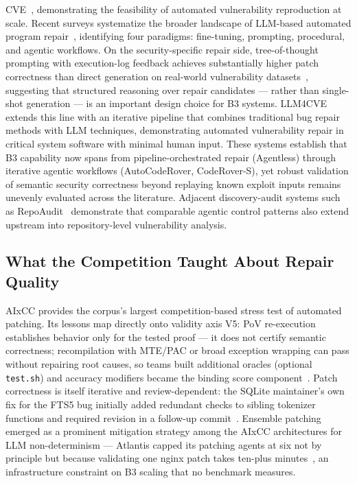 \documentclass[conference,compsoc]{IEEEtran}
\begin{document}
CVE~\cite{cvegenie2025}, demonstrating the feasibility of automated vulnerability reproduction
at scale. Recent surveys systematize the broader landscape of LLM-based automated program
repair~\cite{llmaprsurvey2026}, identifying four paradigms: fine-tuning, prompting, procedural,
and agentic workflows. On the security-specific repair side, tree-of-thought prompting with
execution-log feedback achieves substantially higher patch correctness than direct generation on
real-world vulnerability datasets~\cite{logsinpatchesout2025}, suggesting that structured
reasoning over repair candidates --- rather than single-shot generation --- is an important
design choice for B3 systems. LLM4CVE~\cite{llm4cve2025} extends this line with an iterative
pipeline that combines traditional bug repair methods with LLM techniques, demonstrating
automated vulnerability repair in critical system software with minimal human input.
These systems establish that B3 capability now
spans from pipeline-orchestrated repair (Agentless) through iterative agentic workflows
(AutoCodeRover, CodeRover-S), yet robust
validation of semantic security correctness beyond replaying known exploit inputs remains
unevenly evaluated across the literature.
Adjacent discovery-audit systems such as RepoAudit~\cite{repoaudit2025} demonstrate that
comparable agentic control patterns also extend upstream into repository-level vulnerability
analysis.

\subsection{What the Competition Taught About Repair Quality}
AIxCC provides the corpus's largest competition-based stress test of automated patching. Its lessons
map directly onto validity axis V5: PoV re-execution establishes behavior only for the tested proof --- it does not certify semantic correctness;
recompilation with MTE/PAC or broad exception wrapping can pass without repairing root causes,
so teams built additional oracles (optional \texttt{test.sh}) and accuracy modifiers became the
binding score component~\cite{taafc2025}. Patch correctness is itself iterative and review-dependent:
the SQLite maintainer's own fix for the FTS5 bug initially added redundant checks to sibling
tokenizer functions and required revision in a follow-up commit~\cite{taasc2024}. Ensemble
patching emerged as a prominent mitigation strategy among the AIxCC architectures for LLM non-determinism --- Atlantis capped its
patching agents at six not by principle but because validating one nginx patch takes ten-plus
minutes~\cite{taafc2025}, an infrastructure constraint on B3 scaling that no benchmark measures.
\end{document}
